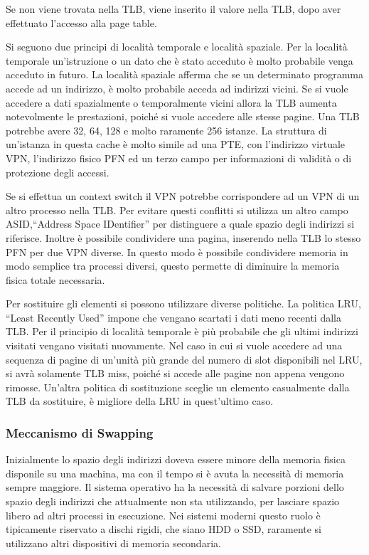 \documentclass{article}
\numberwithin{equation}{subsection}
\begin{document}
Se non viene trovata nella TLB, viene inserito il valore nella TLB, dopo aver effettuato l'accesso alla page table. 

Si seguono due principi di località temporale e località spaziale. Per la località temporale un'istruzione o un dato che è stato acceduto è molto probabile venga 
acceduto in futuro. La località spaziale afferma che se un determinato programma accede ad un indirizzo, è molto probabile acceda ad indirizzi vicini. 
Se si vuole accedere a dati spazialmente o temporalmente vicini allora la TLB aumenta notevolmente le prestazioni, poiché si vuole accedere alle stesse pagine.  
Una TLB potrebbe avere 32, 64, 128 e molto raramente 256 istanze. 
La struttura di un'istanza in questa cache è molto simile ad una PTE, con l'indirizzo virtuale VPN, l'indirizzo fisico PFN ed un terzo campo per informazioni di validità o 
di protezione degli accessi. 


Se si effettua un context switch il VPN potrebbe corrispondere ad un VPN di un altro processo nella TLB. Per evitare questi conflitti si utilizza un altro campo 
ASID,``Address Space IDentifier'' per distinguere a quale spazio degli indirizzi si riferisce. Inoltre è possibile condividere una pagina, inserendo nella TLB lo 
stesso PFN per due VPN diverse. In questo modo è possibile condividere memoria in modo semplice tra processi diversi, questo permette di diminuire la memoria 
fisica totale necessaria. 

Per sostituire gli elementi si possono utilizzare diverse politiche. La politica LRU, ``Least Recently Used'' impone che vengano scartati i dati meno recenti dalla 
TLB. Per il principio di località temporale è più probabile che gli ultimi indirizzi visitati vengano visitati nuovamente. Nel caso in cui si vuole accedere ad una 
sequenza di pagine di un'unità più grande del numero di slot disponibili nel LRU, si avrà solamente TLB miss, poiché si accede alle pagine non appena vengono rimosse. 
Un'altra politica di sostituzione sceglie un elemento casualmente dalla TLB da sostituire, è migliore della LRU in quest'ultimo caso. 

\subsubsection{Meccanismo di Swapping}

Inizialmente lo spazio degli indirizzi doveva essere minore della memoria fisica disponile su una machina, ma con il tempo si è avuta la necessità di memoria sempre 
maggiore. Il sistema operativo ha la necessità di salvare porzioni dello spazio degli indirizzi che attualmente non sta utilizzando, per lasciare spazio libero ad 
altri processi in esecuzione. Nei sistemi moderni questo ruolo è tipicamente riservato a dischi rigidi, che siano HDD o SSD, raramente si utilizzano altri 
dispositivi di memoria secondaria. 
\end{document}
